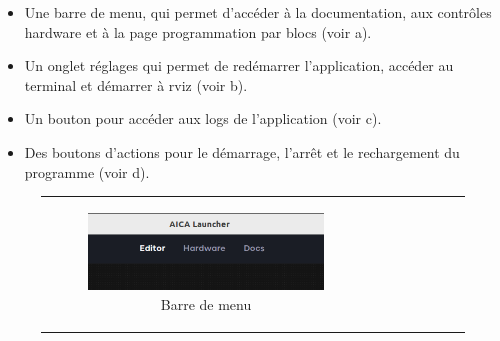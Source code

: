\begin{itemize}
    \item Une barre de menu, qui permet d'accéder à la documentation, aux contrôles \gls{hardware} et à la page programmation par blocs (voir a).
    \item Un onglet réglages qui permet de redémarrer l'application, accéder au terminal et démarrer à \gls{rviz} (voir b).
    \item Un bouton pour accéder aux \gls{logs} de l'application (voir c).
    \item Des boutons d'actions pour le démarrage, l'arrêt et le rechargement du programme (voir d).
\end{itemize}

\begin{figure}[H]
    \centering
    \begin{tabular}{cc}
        \begin{subfigure}{0.45\textwidth}
            \centering
            \includegraphics[width=0.9\linewidth]{assets/figures/AICA_barre_haute.png}
            \caption{Barre de menu}
            \label{fig:aica_barre_menu}
        \end{subfigure} &
        \begin{subfigure}{0.45\textwidth}
            \centering

\end{subfigure}
\end{tabular}
\end{figure}
